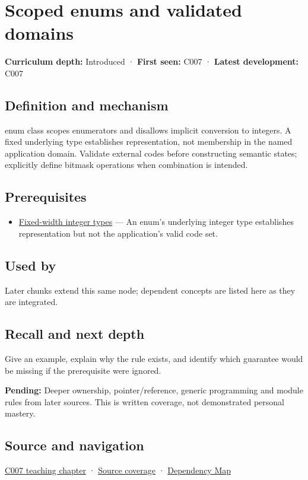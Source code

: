 \hypertarget{appendix-23640fcee147}{}\label{referencestart:appendix-23640fcee147}
\section{Scoped enums and validated domains}\label{appendix-23640fcee147-scoped-enums-and-validated-domains}

\textbf{Curriculum depth:} Introduced · \textbf{First seen:} C007 · \textbf{Latest development:} C007

\subsection{Definition and mechanism}\label{appendix-23640fcee147-definition-and-mechanism}

enum class scopes enumerators and disallows implicit conversion to integers. A fixed underlying type establishes representation, not membership in the named application domain. Validate external codes before constructing semantic states; explicitly define bitmask operations when combination is intended.

\subsection{Prerequisites}\label{appendix-23640fcee147-prerequisites}

\begin{itemize}
\tightlist
\item
  \hyperref[appendix-cc04044b5782]{Fixed-width integer types} --- An enum's underlying integer type establishes representation but not the application's valid code set.
\end{itemize}

\subsection{Used by}\label{appendix-23640fcee147-used-by}

Later chunks extend this same node; dependent concepts are listed here as they are integrated.

\subsection{Recall and next depth}\label{appendix-23640fcee147-recall-and-next-depth}

Give an example, explain why the rule exists, and identify which guarantee would be missing if the prerequisite were ignored.

\textbf{Pending:} Deeper ownership, pointer/reference, generic programming and module rules from later sources. This is written coverage, not demonstrated personal mastery.

\subsection{Source and navigation}\label{appendix-23640fcee147-source-and-navigation}

\hyperref[01-foundations-i-ch002-give-a-domain-its-own-vocabulary]{C007 teaching chapter} · \hyperref[appendix-fd090d982a15-m007---parts-101-112]{Source coverage} · \hyperref[appendix-4ad47bdd269a]{Dependency Map}

